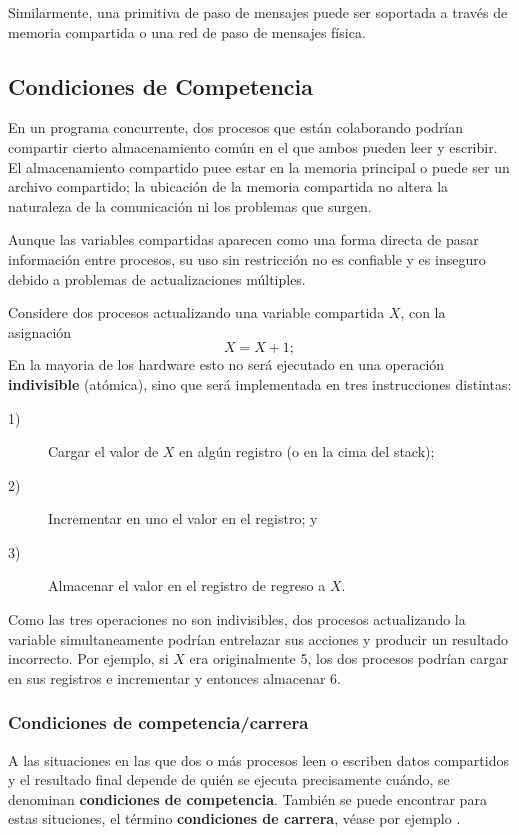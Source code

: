 \documentclass{article}
\begin{document}
Similarmente, una primitiva de paso de mensajes puede ser soportada 
a trav\'es de memoria compartida o una red de paso de mensajes 
f\'isica.

\subsection{Condiciones de Competencia}
En un programa concurrente, dos procesos que est\'an colaborando 
podr\'ian compartir cierto almacenamiento com\'un en el que ambos 
pueden leer y escribir. El almacenamiento compartido puee estar 
en la memoria principal o puede ser un archivo compartido; la 
ubicaci\'on de la memoria compartida no altera la naturaleza de 
la comunicaci\'on ni los problemas que surgen. 

Aunque las variables compartidas aparecen como una forma directa 
de pasar informaci\'on entre procesos, su uso sin restricci\'on 
no es confiable y es inseguro debido a problemas de actualizaciones 
m\'ultiples.

Considere dos procesos actualizando una variable compartida $X$, 
con la asignaci\'on
$$
X=X+1;
$$
En la mayoria de los hardware esto no ser\'a ejecutado en una 
operaci\'on {\bf indivisible} (at\'omica), sino que ser\'a 
implementada en tres instrucciones distintas:
\begin{description}
\item[1)]Cargar el valor de $X$ en alg\'un registro (o en la cima 
del stack);
\item[2)]Incrementar en uno el valor en el registro; y
\item[3)]Almacenar el valor en el registro de regreso a $X$.
\end{description}
Como las tres operaciones no son indivisibles, dos procesos 
actualizando la variable simultaneamente podr\'ian entrelazar sus 
acciones y producir un resultado incorrecto. Por ejemplo, si $X$ 
era originalmente 5, los dos procesos podr\'ian cargar en sus 
registros e incrementar y entonces almacenar 6.

\subsubsection*{Condiciones de competencia/carrera}
A las situaciones en las que dos o m\'as procesos leen o escriben 
datos compartidos y el resultado final depende de qui\'en se 
ejecuta precisamente cu\'ando, se denominan {\bf condiciones de 
competencia}. Tambi\'en se puede encontrar para estas situciones, 
el t\'ermino {\bf condiciones de carrera}, v\'ease por ejemplo 
\cite{LDD3}.
\end{document}
